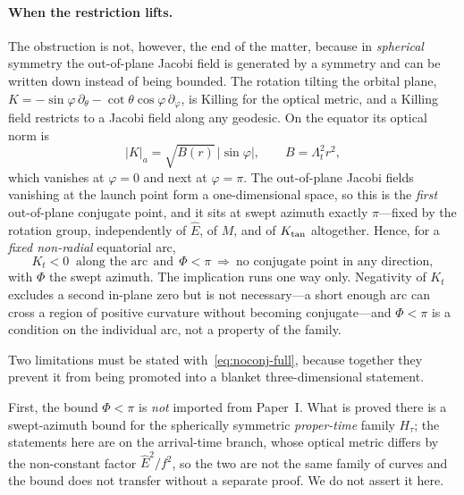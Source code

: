 \documentclass[12pt]{iopart}
\theoremstyle{plain}
\theoremstyle{definition}
\theoremstyle{remark}
\newcommand{\Ehat}{\hat E}
\begin{document}
\paragraph{When the restriction lifts.} The obstruction is not, however, the end
of the matter, because in \emph{spherical} symmetry the out-of-plane Jacobi field
is generated by a symmetry and can be written down instead of being bounded. The
rotation tilting the orbital plane, $K=-\sin\varphi\,\partial_\theta
-\cot\theta\cos\varphi\,\partial_\varphi$, is Killing for the optical metric, and
a Killing field restricts to a Jacobi field along any geodesic. On the equator
its optical norm is
\begin{equation}
    |K|_a=\sqrt{B(r)}\,\bigl|\sin\varphi\bigr| ,\qquad B=\Lambda_t^2r^2 ,
    \label{eq:outofplane-J}
\end{equation}
which vanishes at $\varphi=0$ and next at $\varphi=\pi$. The out-of-plane Jacobi
fields vanishing at the launch point form a one-dimensional space, so this is the
\emph{first} out-of-plane conjugate point, and it sits at swept azimuth exactly
$\pi$---fixed by the rotation group, independently of $\Ehat$, of $M$, and of
$K_{\rm tan}$ altogether. Hence, for a \emph{fixed non-radial} equatorial arc,
\begin{equation}
    K_t<0 \ \text{ along the arc} \ \ \text{and} \ \ \Phi<\pi
    \ \Longrightarrow\
    \text{no conjugate point in any direction} ,
    \label{eq:noconj-full}
\end{equation}
with $\Phi$ the swept azimuth. The implication runs one way only. Negativity of
$K_t$ excludes a second in-plane zero but is not necessary---a short enough arc can
cross a region of positive curvature without becoming conjugate---and $\Phi<\pi$ is
a condition on the individual arc, not a property of the family.

Two limitations must be stated with~\eqref{eq:noconj-full}, because together they
prevent it from being promoted into a blanket three-dimensional statement.

First, the bound $\Phi<\pi$ is \emph{not} imported from Paper~I. What is proved
there is a swept-azimuth bound for the spherically symmetric \emph{proper-time}
family $H_\tau$; the statements here are on the arrival-time branch, whose optical
metric differs by the non-constant factor $\Ehat^2/f^2$, so the two are not the same
family of curves and the bound does not transfer without a separate proof. We do
not assert it here.
\end{document}

